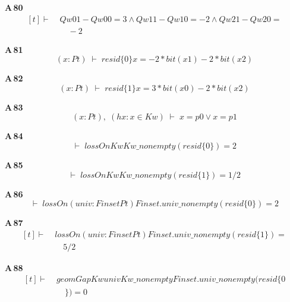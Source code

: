 \noindent\textbf{A\,80}\quad{}
{\footnotesize\[ \begin{aligned}[t]
\vdash\;&\mathit{Qw} 0 1 - \mathit{Qw} 0 0 = 3 \wedge \mathit{Qw} 1 1 - \mathit{Qw} 1 0 = -2 \wedge \mathit{Qw} 2 1 - \mathit{Qw} 2 0 =\\
&\quad -2
\end{aligned} \]}

\noindent\textbf{A\,81}\quad{}
{\footnotesize\[ (\mathit{x} : \mathit{Pt}) \;\vdash\; \mathit{resid} \{ 0\} \mathit{x} = -2 * \mathit{bit} (\mathit{x} 1) - 2 * \mathit{bit} (\mathit{x} 2) \]}

\noindent\textbf{A\,82}\quad{}
{\footnotesize\[ (\mathit{x} : \mathit{Pt}) \;\vdash\; \mathit{resid} \{ 1\} \mathit{x} = 3 * \mathit{bit} (\mathit{x} 0) - 2 * \mathit{bit} (\mathit{x} 2) \]}

\noindent\textbf{A\,83}\quad{}
{\footnotesize\[ (\mathit{x} : \mathit{Pt}),\; (\mathit{hx} : \mathit{x} \in \mathit{Kw}) \;\vdash\; \mathit{x} = \mathit{p0} \vee \mathit{x} = \mathit{p1} \]}

\noindent\textbf{A\,84}\quad{}
{\footnotesize\[ \vdash\; \mathit{lossOn} \mathit{Kw} \mathit{Kw\_nonempty} (\mathit{resid} \{ 0\} ) = 2 \]}

\noindent\textbf{A\,85}\quad{}
{\footnotesize\[ \vdash\; \mathit{lossOn} \mathit{Kw} \mathit{Kw\_nonempty} (\mathit{resid} \{ 1\} ) = 1 / 2 \]}

\noindent\textbf{A\,86}\quad{}
{\footnotesize\[ \vdash\; \mathit{lossOn} (\mathit{univ} : \mathit{Finset} \mathit{Pt}) \mathit{Finset}.\mathit{univ\_nonempty} (\mathit{resid} \{ 0\} ) = 2 \]}

\noindent\textbf{A\,87}\quad{}
{\footnotesize\[ \begin{aligned}[t]
\vdash\;&\mathit{lossOn} (\mathit{univ} : \mathit{Finset} \mathit{Pt}) \mathit{Finset}.\mathit{univ\_nonempty} (\mathit{resid} \{ 1\} ) =\\
&\quad 5 / 2
\end{aligned} \]}

\noindent\textbf{A\,88}\quad{}
{\footnotesize\[ \begin{aligned}[t]
\vdash\;&\mathit{geomGap} \mathit{Kw} \mathit{univ} \mathit{Kw\_nonempty} \mathit{Finset}.\mathit{univ\_nonempty} (\mathit{resid} \{ 0\\
&\quad \} ) = 0
\end{aligned} \]}

